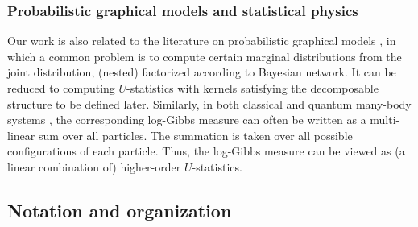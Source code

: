 \documentclass[12pt]{article}
\theoremstyle{plain}
\theoremstyle{definition}
\begin{document}
\begin{bibunit}[agsm]
\subsubsection*{Probabilistic graphical models and statistical physics}

Our work is also related to the literature on probabilistic graphical models \citep{pearl1988probabilistic, shpitser2011efficient}, in which a common problem is to compute certain marginal distributions from the joint distribution, (nested) factorized according to Bayesian network. It can be reduced to computing $U$-statistics with kernels satisfying the decomposable structure to be defined later. Similarly, in both classical \citep{talagrand2010mean, li2020random} and quantum many-body systems \citep{bernaschi2024quantum}, the corresponding log-Gibbs measure can often be written as a multi-linear sum over all particles. The summation is taken over all possible configurations of each particle. Thus, the log-Gibbs measure can be viewed as (a linear combination of) higher-order $U$-statistics.
\fi





\subsection*{Notation and organization}


\end{bibunit}
\end{document}
